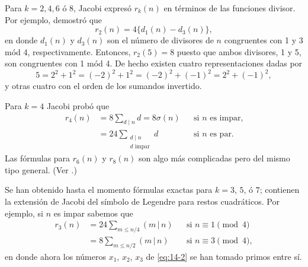     Para $k=2,4,6$ ó $8$, Jacobi \cite{jacobi1829} expresó $r_k(n)$ en términos de las funciones
    divisor. Por ejemplo, demostró que
    \begin{equation*}
        r_2(n)=4\{d_1(n)-d_3(n)\},
    \end{equation*}
    en donde $d_1(n)$ y $d_3(n)$ son el número de divisores de $n$ congruentes con 1 y 3 mód 4,
    respectivamente. Entonces, $r_2(5)=8$ puesto que ambos divisores, 1 y 5, son congruentes
    con 1 mód 4. De hecho existen cuatro representaciones dadas por
    \begin{equation*}
        5=2^2+1^2=(-2)^2+1^2=(-2)^2+(-1)^2=2^2+(-1)^2,
    \end{equation*}
    y otras cuatro con el orden de los sumandos invertido.

    Para $k=4$ Jacobi probó que
    \begin{align*}
        r_4(n)&=8\sum_{d\mid n}d=8\sigma(n)&&\text{si }n\text{ es impar,}\\
        &=24\sum_{\substack{d\mid n\\d\text{ impar}}}d&&\text{si }n\text{ es par.}
    \end{align*}
    Las fórmulas para $r_6(n)$ y $r_8(n)$ son algo más complicadas pero del mismo tipo general.
    (Ver \cite{dickson1930}.)

    Se han obtenido hasta el momento fórmulas exactas para $k=3$, $5$, ó $7$; contienen la
    extensión de Jacobi del símbolo de Legendre para restos cuadráticos. Por ejemplo, si $n$ es
    impar sabemos que
    \begin{align*}
        r_3(n)&=24\sum_{m\leq n/4}(m\,|\,n)&&\text{si }n\equiv1\pmod{4}\\
        &=8\sum_{m\leq n/2}(m\,|\,n)&&\text{si }n\equiv3\pmod{4},
    \end{align*}
    en donde ahora los números $x_1$, $x_2$, $x_3$ de \eqref{eq:14-2} se han tomado primos entre
    sí.

